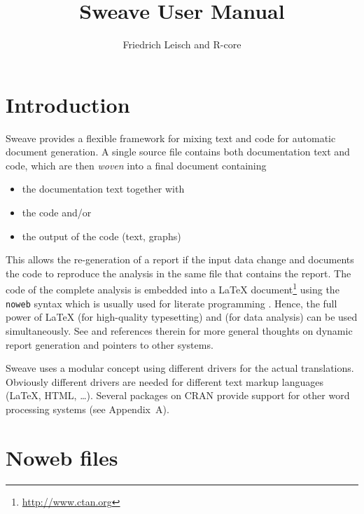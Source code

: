 \documentclass[a4paper]{article}
\title{Sweave User Manual}
\author{Friedrich Leisch and R-core}
\begin{document}
\maketitle

\section{Introduction}
\label{sec:intro}

Sweave provides a flexible framework for mixing text and \R{} code for
automatic document generation. A single source file contains both
documentation text and \R{} code, which are then \emph{woven} into a
final document containing
\begin{itemize}
 \item the documentation text together with
 \item the \R{} code and/or
 \item the output of the code (text, graphs)
\end{itemize}
This allows the re-generation of a report if the input data change and
documents the code to reproduce the analysis in the same file that
contains the report. The \R{} code of the complete analysis is embedded
into a \LaTeX{} document\footnote{\url{http://www.ctan.org}} using the
\texttt{noweb} syntax \citep{flm:Ramsey:1998} which is usually used
for literate programming \cite{fla:Knuth:1984}.  Hence, the full power
of \LaTeX{} (for high-quality typesetting) and \R{} (for data analysis)
can be used simultaneously. See \cite{e1071-papers:Leisch:2002} and
references therein for more general thoughts on dynamic report
generation and pointers to other systems.

Sweave uses a modular concept using different drivers for the actual
translations. Obviously different drivers are needed for different
text markup languages (\LaTeX{}, HTML, \ldots). Several packages on
CRAN provide support for other word processing systems (see
Appendix~A).


\section{Noweb files}
\label{sec:noweb}
\end{document}

